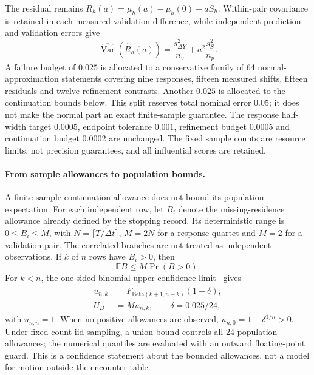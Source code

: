 \documentclass[aps,prd,reprint,amsmath,amssymb,superscriptaddress,nofootinbib,longbibliography,floatfix]{revtex4-2}
\begin{document}
The residual remains $R_h(a)=\mu_h(a)-\mu_h(0)-aS_h$. Within-pair covariance is retained in each measured validation difference, while independent prediction and validation errors give
\begin{equation}
\widehat{\operatorname{Var}}(\widehat R_h(a))
=\frac{s_{\Delta Y}^2}{n_v}
+a^2\frac{s_S^2}{n_p}.
\label{eq:independent-residual-variance}
\end{equation}
A failure budget of $0.025$ is allocated to a conservative family of 64 normal-approximation statements covering nine responses, fifteen measured shifts, fifteen residuals and twelve refinement contrasts. Another $0.025$ is allocated to the continuation bounds below. This split reserves total nominal error $0.05$; it does not make the normal part an exact finite-sample guarantee. The response half-width target $0.0005$, endpoint tolerance $0.001$, refinement budget $0.0005$ and continuation budget $0.0002$ are unchanged. The fixed sample counts are resource limits, not precision guarantees, and all influential scores are retained.

\paragraph{From sample allowances to population bounds.}
A finite-sample continuation allowance does not bound its population expectation. For each independent row, let $B_i$ denote the missing-residence allowance already defined by the stopping record. Its deterministic range is $0\leq B_i\leq M$, with $N=\lceil T/\Delta t\rceil$, $M=2N$ for a response quartet and $M=2$ for a validation pair. The correlated branches are not treated as independent observations. If $k$ of $n$ rows have $B_i>0$, then
\begin{equation}
\mathbb E B\leq M\Pr(B>0).
\label{eq:continuation-occurrence}
\end{equation}
For $k<n$, the one-sided binomial upper confidence limit~\cite{Clopper1934} gives
\begin{align}
u_{n,k}&=F^{-1}_{\mathrm{Beta}(k+1,n-k)}(1-\delta),
\nonumber\\
U_B&=M u_{n,k},\qquad \delta=0.025/24,
\label{eq:population-continuation}
\end{align}
with $u_{n,n}=1$. When no positive allowances are observed, $u_{n,0}=1-\delta^{1/n}>0$. Under fixed-count iid sampling, a union bound controls all 24 population allowances; the numerical quantiles are evaluated with an outward floating-point guard. This is a confidence statement about the bounded allowances, not a model for motion outside the encounter table.
\end{document}
